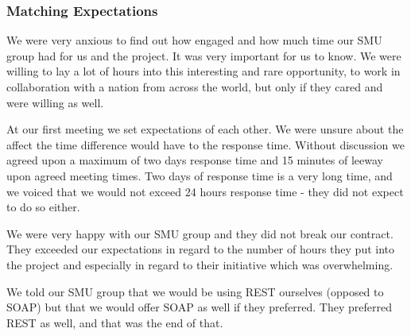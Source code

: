 \subsubsection{Matching Expectations}
We were very anxious to find out how engaged and how much time our SMU group had for us and the project. It was very important for us to know. We were willing to lay a lot of hours into this interesting and rare opportunity, to work in collaboration with a nation from across the world, but only if they cared and were willing as well.

At our first meeting we set expectations of each other. We were unsure about the affect the time difference would have to the response time. Without discussion we agreed upon a maximum of two days response time and 15 minutes of leeway upon agreed meeting times. Two days of response time is a very long time, and we voiced that we would not exceed 24 hours response time - they did not expect to do so either.

We were very happy with our SMU group and they did not break our contract. They exceeded our expectations in regard to the number of hours they put into the project and especially in regard to their initiative which was overwhelming.

We told our SMU group that we would be using REST ourselves (opposed to SOAP) but that we would offer SOAP as well if they preferred. They preferred REST as well, and that was the end of that.